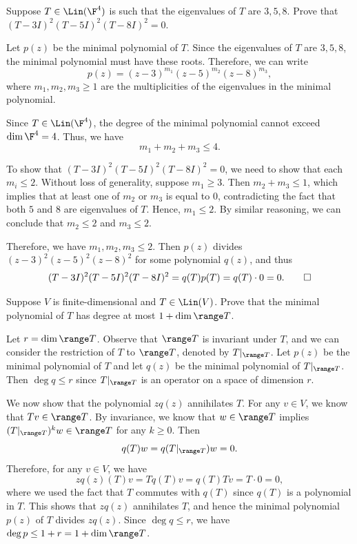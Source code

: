 \begin{exercise}
Suppose $T\in\Lin(\F^4)$ is such that the eigenvalues of $T$ are $3,5,8$.
Prove that $(T-3I)^2(T-5I)^2(T-8I)^2=0$.
\end{exercise}
\begin{solution}
Let $p(z)$ be the minimal polynomial of $T$. Since the eigenvalues of $T$ are
$3,5,8$, the minimal polynomial must have these roots. Therefore, we can write
\[ p(z)=(z-3)^{m_1}(z-5)^{m_2}(z-8)^{m_3}, \]
where $m_1,m_2,m_3\ge1$ are the multiplicities of the eigenvalues in the
minimal polynomial.

Since $T\in\Lin(\F^4)$, the degree of the minimal polynomial cannot exceed
$\dim\F^4=4$. Thus, we have
\[ m_1+m_2+m_3\le4. \]

To show that $(T-3I)^2(T-5I)^2(T-8I)^2=0$, we need to show that each
$m_i\le2$. Without loss of generality, suppose $m_1\ge3$. Then
$m_2+m_3\le1$, which implies that at least one of $m_2$ or $m_3$ is equal to
$0$, contradicting the fact that both $5$ and $8$ are eigenvalues of $T$.
Hence, $m_1\le2$. By similar reasoning, we can conclude that $m_2\le2$ and
$m_3\le2$.

Therefore, we have $m_1,m_2,m_3\le2$. Then $p(z)$ divides
$(z-3)^2(z-5)^2(z-8)^2$ for some polynomial $q(z)$, and thus
\[ (T-3I)^2(T-5I)^2(T-8I)^2=q(T)p(T)=q(T)\cdot0=0. \qedhere \]
\end{solution}

\begin{exercise}
Suppose $V$ is finite-dimensional and $T\in\Lin(V)$. Prove that the minimal
polynomial of $T$ has degree at most $1+\dim\range T$.
\end{exercise}
\begin{solution}
Let $r=\dim\range T$. Observe that $\range T$ is invariant under $T$, and we
can consider the restriction of $T$ to $\range T$, denoted by
$T|_{\range T}$. Let $p(z)$ be the minimal polynomial of $T$ and let $q(z)$ be
the minimal polynomial of $T|_{\range T}$. Then $\deg q\le r$ since
$T|_{\range T}$ is an operator on a space of dimension $r$.

We now show that the polynomial $zq(z)$ annihilates $T$. For any $v\in V$, we
know that $Tv\in\range T$. By invariance, we know that $w\in\range T$ implies
$(T|_{\range T})^kw\in\range T$ for any $k\ge0$. Then
\[ q(T)w=q(T|_{\range T})w=0. \]
Therefore, for any $v\in V$, we have
\[ zq(z)(T)v=Tq(T)v=q(T)Tv=T\cdot0=0, \]
where we used the fact that $T$ commutes with $q(T)$ since $q(T)$ is a
polynomial in $T$. This shows that $zq(z)$ annihilates $T$, and hence the
minimal polynomial $p(z)$ of $T$ divides $zq(z)$. Since $\deg q\le r$, we have
$\deg p\le1+r=1+\dim\range T$.
\end{solution}

